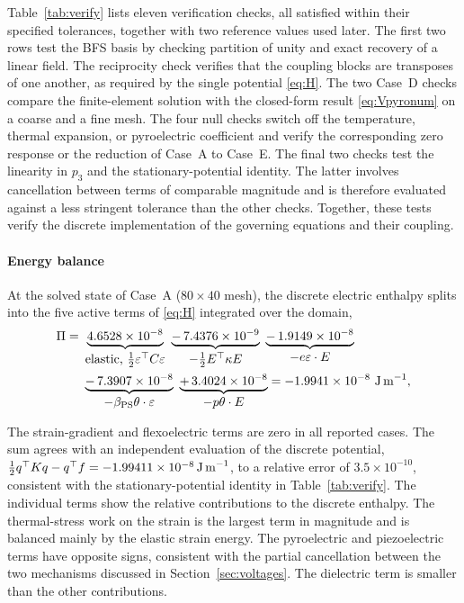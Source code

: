 \documentclass[a4paper, 11pt, twoside]{article}
\begin{document}
Table~\ref{tab:verify} lists eleven verification checks, all satisfied within their
specified tolerances, together with two reference values used later. The first two
rows test the BFS basis by checking partition of unity and exact recovery of a linear
field. The reciprocity check verifies that the coupling blocks are transposes of one
another, as required by the single potential \eqref{eq:H}. The two Case~D checks
compare the finite-element solution with the closed-form result
\eqref{eq:Vpyronum} on a coarse and a fine mesh. The four null checks switch off the
temperature, thermal expansion, or pyroelectric coefficient and verify the corresponding
zero response or the reduction of Case~A to Case~E. The final two checks test the
linearity in $p_3$ and the stationary-potential identity. The latter involves
cancellation between terms of comparable magnitude and is therefore evaluated against
a less stringent tolerance than the other checks. Together, these tests verify the
discrete implementation of the governing equations and their coupling.

\paragraph{Energy balance}
At the solved state of Case~A ($80\times40$ mesh), the discrete electric enthalpy
splits into the five active terms of \eqref{eq:H} integrated over the domain,
\begin{align}
\Pi=\ &
\underbrace{4.6528\times10^{-8}}_{\mbox{\normalsize elastic, $\tfrac12\varepsilon^\top C\varepsilon$}}
\ \underbrace{-\,7.4376\times10^{-9}}_{\mbox{\normalsize $-\tfrac12E^\top\kappa E$}}
\ \underbrace{-\,1.9149\times10^{-8}}_{\mbox{\normalsize $-e\varepsilon\cdot E$}}
\notag\\
&\underbrace{-\,7.3907\times10^{-8}}_{\mbox{\normalsize $-\beta_{\mathrm{PS}}\theta\cdot\varepsilon$}}
\ \underbrace{+\,3.4024\times10^{-8}}_{\mbox{\normalsize $-p\theta\cdot E$}}
=-1.9941\times10^{-8}\ \text{J\,m}^{-1},
\label{eq:energyaudit}
\end{align}

The strain-gradient and flexoelectric terms are zero in all reported cases. The sum
agrees with an independent evaluation of the discrete potential,
$\tfrac12q^\top Kq-q^\top f=-1.99411\times10^{-8}\,\text{J\,m}^{-1}$, to a relative
error of $3.5\times10^{-10}$, consistent with the stationary-potential identity in
Table~\ref{tab:verify}. The individual terms show the relative contributions to the
discrete enthalpy. The thermal-stress work on the strain is the largest term in
magnitude and is balanced mainly by the elastic strain energy. The pyroelectric and
piezoelectric terms have opposite signs, consistent with the partial cancellation
between the two mechanisms discussed in Section~\ref{sec:voltages}. The dielectric
term is smaller than the other contributions.
\end{document}
